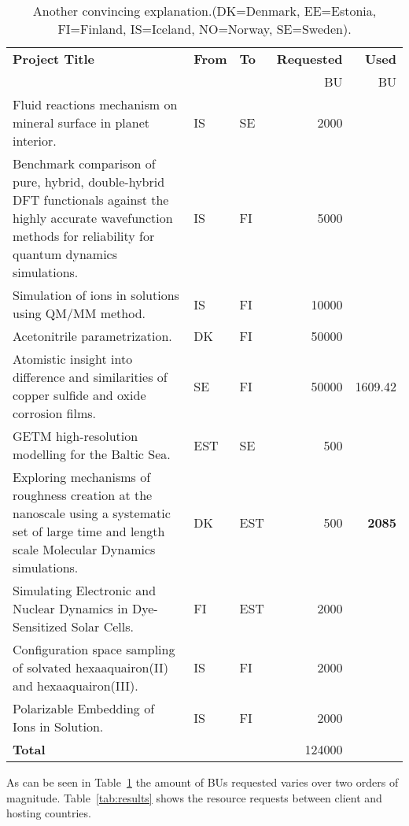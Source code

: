 \begin{table}
\begin{center}
\begin{tabular}{|p{7cm}|l|l|r|r|} \hline
\bf Project Title & \bf From & \bf To &\bf Requested &\bf Used \\
                  & & & BU & BU \\\hline
Fluid reactions mechanism on mineral surface in planet interior. & IS & SE & 2000 &  \\
Benchmark comparison of pure, hybrid, double-hybrid DFT functionals against the highly accurate wavefunction methods for reliability for quantum dynamics simulations. & IS & FI & 5000 & \\
Simulation of ions in solutions using QM/MM method. & IS & FI & 10000 & \\
Acetonitrile parametrization. & DK & FI & 50000 & \\
Atomistic insight into difference and similarities of copper sulfide and oxide corrosion films. & SE & FI & 50000 & 1609.42 \\
GETM high-resolution modelling for the Baltic Sea. & EST & SE & 500 & \\
Exploring mechanisms of roughness creation at the nanoscale using a systematic set of large time and length scale Molecular Dynamics simulations. & DK & EST & 500 & {\bf 2085}\\
Simulating Electronic and Nuclear Dynamics in Dye-Sensitized Solar Cells. & FI & EST & 2000 & \\
Configuration space sampling of solvated hexaaquairon(II) and hexaaquairon(III). & IS & FI & 2000 & \\
Polarizable Embedding of Ions in Solution. & IS & FI & 2000 & \\
\bf Total & & & 124000 & \\\hline
\end{tabular}
\caption{Another convincing explanation.(DK=Denmark, EE=Estonia, FI=Finland, IS=Iceland, NO=Norway, SE=Sweden). \label{tab:projects}}
\end{center}
\end{table}
As can be seen in Table~\ref{tab:projects} the amount of BUs requested varies over two orders of magnitude.
Table~\ref{tab:results} shows the resource requests between client and hosting countries.
